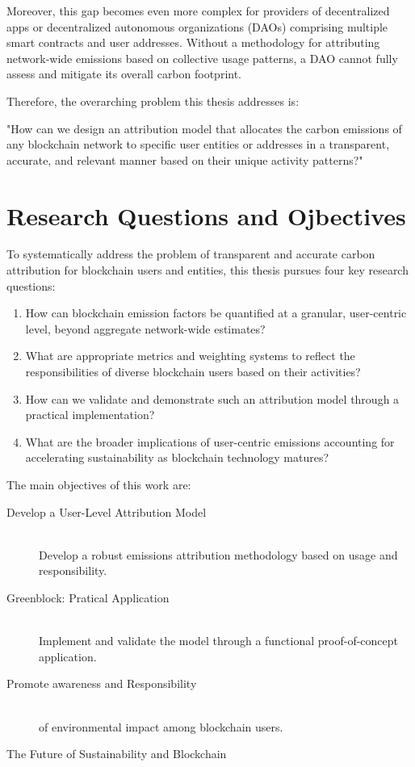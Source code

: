 \documentclass[11pt]{report}
\begin{document}
Moreover, this gap becomes even more complex for providers of decentralized apps or decentralized autonomous organizations (DAOs) comprising multiple smart contracts and user addresses. Without a methodology for attributing network-wide emissions based on collective usage patterns, a DAO cannot fully assess and mitigate its overall carbon footprint.

Therefore, the overarching problem this thesis addresses is:

"How can we design an attribution model that allocates the carbon emissions of any blockchain network to specific user entities or addresses in a transparent, accurate, and relevant manner based on their unique activity patterns?"


\section{Research Questions and Ojbectives}

To systematically address the problem of transparent and accurate carbon attribution for blockchain users and entities, this thesis pursues four key research questions:

\begin{enumerate}
    \item How can blockchain emission factors be quantified at a granular, user-centric level, beyond aggregate network-wide estimates?
    \item What are appropriate metrics and weighting systems to reflect the responsibilities of diverse blockchain users based on their activities?
    \item How can we validate and demonstrate such an attribution model through a practical implementation?
    \item What are the broader implications of user-centric emissions accounting for accelerating sustainability as blockchain technology matures?
\end{enumerate}

The main objectives of this work are:

\begin{description}

    \item [Develop a User-Level Attribution Model] \hfill \\
          Develop a robust emissions attribution methodology based on usage and responsibility.
    \item [Greenblock: Pratical Application] \hfill \\
          Implement and validate the model through a functional proof-of-concept application.
    \item [Promote awareness and Responsibility] \hfill \\
          of environmental impact among blockchain users.
    \item [The Future of Sustainability and Blockchain] 
\end{description}
\end{document}
